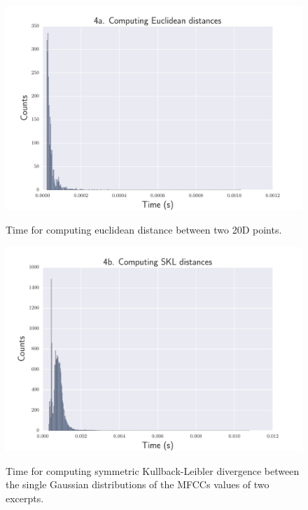 \begin{figure}[htbp]
\begin{center}
\includegraphics[scale=0.6]{Figures/bench_euclidean.pdf}
  \caption[Time for computing euclidean distance]{Time for computing euclidean distance between two 20D points.}
  \label{fig:step4}
\vspace{1cm}
\includegraphics[scale=0.6]{Figures/bench_skl.pdf}
  \caption[Time for computing symmetric Kullback-Leibler distance]{Time for computing symmetric Kullback-Leibler divergence between the single Gaussian distributions of the MFCCs values of two excerpts.}
  \label{fig:step5}
\end{center}
\end{figure}

